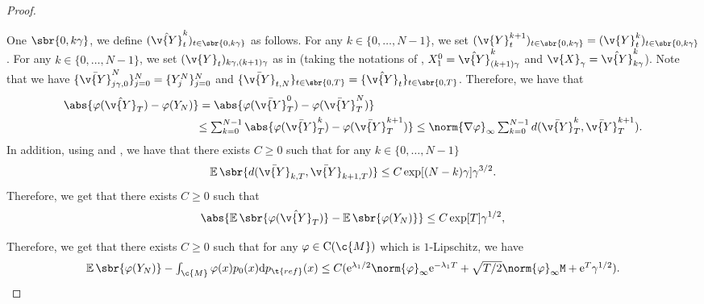 \begin{proof}
\begin{enumerate}[wide, labelindent=0pt, label=(\alph*)]
		      One $\sbr{0, k\gamma}$, we define $(\hat{\v{Y}}_t^k)_{t \in \sbr{0, k\gamma}}$ as follows.
		      For any $k \in \{0, \dots, N-1\}$, we set $(\v{Y}_t^{k+1})_{t \in \sbr{0, k\gamma}} = (\v{Y}_t^k)_{t \in \sbr{0, k\gamma}}$.
		      For any $k \in \{0, \dots, N-1\}$, we set $(\v{Y}_t)_{k\gamma, (k+1)\gamma}$ as in  (taking the notations of , $X_1^0 = \hat{\v{Y}}_{(k+1)\gamma}^k$ and $\v{X}_\gamma = \hat{\v{Y}}_{k \gamma}^k$).
		      Note that we have $\{\bar{\v{Y}}_{j\gamma,0}^N\}_{j=0}^N = \{Y_j^N\}_{j=0}^N$ and $\{\bar{\v{Y}}_{t, N}\}_{t \in \sbr{0,T}} = \{\hat{\v{Y}}_t\}_{t \in \sbr{0,T}}$.
		      Therefore, we have that \begin{align} \textstyle{ \abs{\varphi(\hat{\v{Y}}_T) - \varphi(Y_N)}} & =\abs{\varphi(\bar{\v{Y}}_{T}^0) - \varphi(\bar{\v{Y}}_{T}^N)} \\ &\textstyle{\leq \sum_{k=0}^{N-1} \abs{\varphi(\bar{\v{Y}}_{T}^k) - \varphi(\bar{\v{Y}}_{T}^{k+1})} \leq \norm{\nabla \varphi}_\infty \sum_{k=0}^{N-1} d(\bar{\v{Y}}_{T}^k, \bar{\v{Y}}_{T}^{k+1}) } .
		      \end{align}
		      In addition, using  and , we have that there exists $C \geq 0$ such that for any $k \in \{0, \dots, N-1\}$ \begin{equation} \E\sbr{d(\bar{\v{Y}}_{k,T}, \bar{\v{Y}}_{k+1, T})} \leq C \exp[(N-k) \gamma] \gamma^{3/2} .
		      \end{equation}
		      Therefore, we get that there exists $C \geq 0$ such that \begin{equation} \abs{\E\sbr{\varphi(\hat{\v{Y}}_T)} - \E\sbr{\varphi(Y_N)}} \leq C \exp[T] \gamma^{1/2} , \end{equation} \end{enumerate} 

	Therefore, we get that there exists $C \geq 0$ such that for any $\varphi \in \mathrm{C}(\c{M})$ which is $1$-Lipschitz, we have \begin{equation} \label{eq:inter} \textstyle{ \E\sbr{\varphi(Y_N)} - \int_{\c{M}} \varphi(x) p_{0}(x) \mathrm{d} p_{\t{ref}}(x) \leq C (\mathrm{e}^{\lambda_1/2}\norm{\varphi}_\infty \mathrm{e}^{-\lambda_1 T} + \sqrt{T/2} \norm{\varphi}_\infty \mathtt{M} + \mathrm{e}^T \gamma^{1/2}) .
		}
	\end{equation}


\end{proof}
